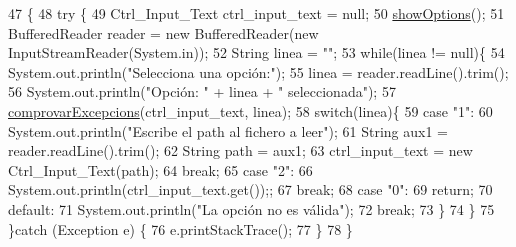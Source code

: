 \begin{DoxyCode}
47                                            \{
48     \textcolor{keywordflow}{try} \{
49         Ctrl\_Input\_Text ctrl\_input\_text = null;
50         \hyperlink{classpersistencia_1_1input_1_1Driver____Ctrl__Input__Text_a51d02aa85468b0924d13e4060106459e}{showOptions}();
51         BufferedReader reader = \textcolor{keyword}{new} BufferedReader(\textcolor{keyword}{new} InputStreamReader(System.in));
52         String linea = \textcolor{stringliteral}{""};
53         \textcolor{keywordflow}{while}(linea != null)\{
54             System.out.println(\textcolor{stringliteral}{"Selecciona una opción:"});
55             linea = reader.readLine().trim();
56             System.out.println(\textcolor{stringliteral}{"Opción: "} + linea + \textcolor{stringliteral}{" seleccionada"});
57             \hyperlink{classpersistencia_1_1input_1_1Driver____Ctrl__Input__Text_a3e4149adb11b97b330ce77f1c2b5ae9c}{comprovarExcepcions}(ctrl\_input\_text, linea);
58             \textcolor{keywordflow}{switch}(linea)\{
59                 \textcolor{keywordflow}{case} \textcolor{stringliteral}{"1"}:
60                     System.out.println(\textcolor{stringliteral}{"Escribe el path al fichero a leer"});
61                     String aux1 = reader.readLine().trim();
62                     String path = aux1;
63                     ctrl\_input\_text = \textcolor{keyword}{new} Ctrl\_Input\_Text(path);
64                 \textcolor{keywordflow}{break};
65                 \textcolor{keywordflow}{case} \textcolor{stringliteral}{"2"}:
66                     System.out.println(ctrl\_input\_text.get());;
67                 \textcolor{keywordflow}{break};
68                 \textcolor{keywordflow}{case} \textcolor{stringliteral}{"0"}:
69                     \textcolor{keywordflow}{return};
70                 \textcolor{keywordflow}{default}:
71                     System.out.println(\textcolor{stringliteral}{"La opción no es válida"});
72                 \textcolor{keywordflow}{break};
73             \}
74         \}
75     \}\textcolor{keywordflow}{catch} (Exception e) \{
76         e.printStackTrace();
77     \}
78     \}
\end{DoxyCode}
\mbox{\label{classpersistencia_1_1input_1_1Driver____Ctrl__Input__Text_a51d02aa85468b0924d13e4060106459e}} 

